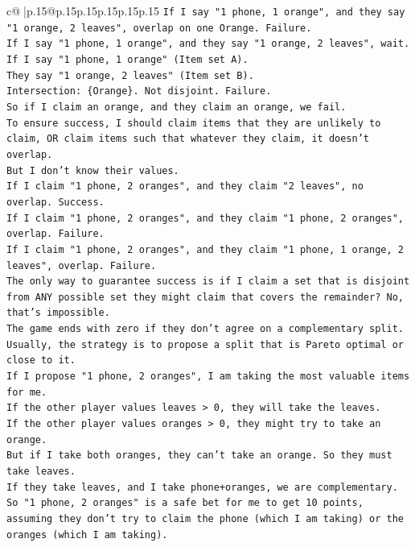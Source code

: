 \documentclass{article}
\begin{document}
{\begin{supertabular}{c@{$\;$}|p{.15\linewidth}@{}p{.15\linewidth}p{.15\linewidth}p{.15\linewidth}p{.15\linewidth}p{.15\linewidth}}
{{{\texttt{If I say "1 phone, 1 orange", and they say "1 orange, 2 leaves", overlap on one Orange. Failure.} \\
\texttt{If I say "1 phone, 1 orange", and they say "1 orange, 2 leaves", wait.} \\
\texttt{If I say "1 phone, 1 orange" (Item set A).} \\
\texttt{They say "1 orange, 2 leaves" (Item set B).} \\
\texttt{Intersection: \{Orange\}. Not disjoint. Failure.} \\
\texttt{So if I claim an orange, and they claim an orange, we fail.} \\
\texttt{To ensure success, I should claim items that they are unlikely to claim, OR claim items such that whatever they claim, it doesn't overlap.} \\
\texttt{But I don't know their values.} \\
\texttt{If I claim "1 phone, 2 oranges", and they claim "2 leaves", no overlap. Success.} \\
\texttt{If I claim "1 phone, 2 oranges", and they claim "1 phone, 2 oranges", overlap. Failure.} \\
\texttt{If I claim "1 phone, 2 oranges", and they claim "1 phone, 1 orange, 2 leaves", overlap. Failure.} \\
\texttt{The only way to guarantee success is if I claim a set that is disjoint from ANY possible set they might claim that covers the remainder? No, that's impossible.} \\
\texttt{The game ends with zero if they don't agree on a complementary split.} \\
\texttt{Usually, the strategy is to propose a split that is Pareto optimal or close to it.} \\
\texttt{If I propose "1 phone, 2 oranges", I am taking the most valuable items for me.} \\
\texttt{If the other player values leaves > 0, they will take the leaves.} \\
\texttt{If the other player values oranges > 0, they might try to take an orange.} \\
\texttt{But if I take both oranges, they can't take an orange. So they must take leaves.} \\
\texttt{If they take leaves, and I take phone+oranges, we are complementary.} \\
\texttt{So "1 phone, 2 oranges" is a safe bet for me to get 10 points, assuming they don't try to claim the phone (which I am taking) or the oranges (which I am taking).} \\
}}}
\end{supertabular}}
\end{document}
